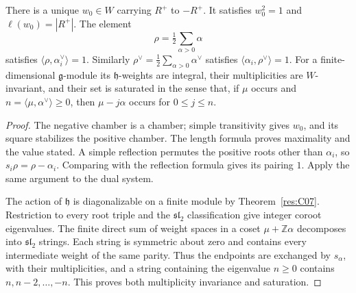 \begin{proposition}\label{res:E08}
There is a unique \(w_0\in W\) carrying \(R^+\) to \(-R^+\).
It satisfies \(w_0^2=1\) and \(\ell(w_0)=|R^+|\).
The element
\[
 \rho=\tfrac12\sum_{\alpha>0}\alpha
\]
satisfies \(\langle\rho,\alpha_i^\vee\rangle=1\).
Similarly \(\rho^\vee=\frac12\sum_{\alpha>0}\alpha^\vee\)
satisfies \(\langle\alpha_i,\rho^\vee\rangle=1\).
For a finite-dimensional \(\mathfrak g\)-module its
\(\mathfrak h\)-weights are integral, their multiplicities
are \(W\)-invariant, and their set is saturated in the sense
that, if \(\mu\) occurs and \(n=\langle\mu,\alpha^\vee\rangle
\ge0\), then \(\mu-j\alpha\) occurs for \(0\le j\le n\).
\end{proposition}
\begin{proof}
The negative chamber is a chamber; simple transitivity gives
\(w_0\), and its square stabilizes the positive chamber.
The length formula proves maximality and the value stated.
A simple reflection permutes the positive roots other
than \(\alpha_i\), so \(s_i\rho=\rho-\alpha_i\).
Comparing with the reflection formula gives its pairing \(1\).
Apply the same argument to the dual system.

The action of \(\mathfrak h\) is diagonalizable on a finite
module by Theorem~\ref{res:C07}. Restriction to every root
triple and the \(\mathfrak{sl}_2\) classification give
integer coroot eigenvalues. The finite direct sum of
weight spaces in a coset \(\mu+\mathbb Z\alpha\)
decomposes into \(\mathfrak{sl}_2\) strings.
Each string is symmetric about zero and contains every
intermediate weight of the same parity. Thus the endpoints
are exchanged by \(s_\alpha\), with their multiplicities,
and a string containing the eigenvalue \(n\ge0\)
contains \(n,n-2,\ldots,-n\).
This proves both multiplicity invariance and saturation.
\end{proof}


